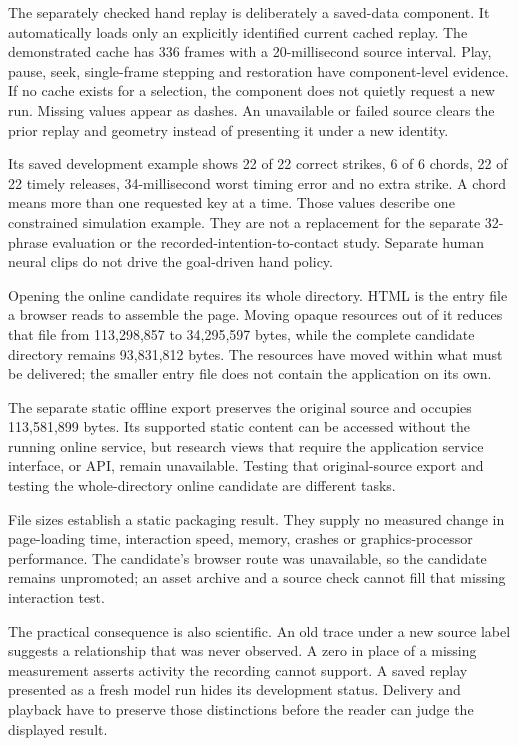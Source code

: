 The separately checked hand replay is deliberately a saved-data component.
It automatically loads only an explicitly identified current cached replay.
The demonstrated cache has 336 frames with a 20-millisecond source interval.
Play, pause, seek, single-frame stepping and restoration have component-level
evidence. If no cache exists for a selection, the component does not quietly
request a new run. Missing values appear as dashes. An unavailable or failed
source clears the prior replay and geometry instead of presenting it under a
new identity.

Its saved development example shows 22 of 22 correct strikes, 6 of 6 chords,
22 of 22 timely releases, 34-millisecond worst timing error and no extra strike.
A chord means more than one requested key at a time. Those values describe
one constrained simulation example. They are not a replacement for the separate
32-phrase evaluation or the recorded-intention-to-contact study. Separate human
neural clips do not drive the goal-driven hand policy.

Opening the online candidate requires its whole directory. HTML is the entry
file a browser reads to assemble the page. Moving opaque resources out of it
reduces that file from 113,298,857 to 34,295,597 bytes, while the complete
candidate directory remains 93,831,812 bytes. The resources have moved within
what must be delivered; the smaller entry file does not contain the application
on its own.

The separate static offline export preserves the original source and occupies
113,581,899 bytes. Its supported static content can be accessed without the
running online service, but research views that require the application service
interface, or API, remain unavailable. Testing that original-source export and
testing the whole-directory online candidate are different tasks.

File sizes establish a static packaging result. They supply no measured change
in page-loading time, interaction speed, memory, crashes or graphics-processor
performance. The candidate's browser route was unavailable, so the candidate
remains unpromoted; an asset archive and a source check cannot fill that missing
interaction test.

The practical consequence is also scientific. An old trace under a new source
label suggests a relationship that was never observed. A zero in place of a
missing measurement asserts activity the recording cannot support. A saved
replay presented as a fresh model run hides its development status. Delivery
and playback have to preserve those distinctions before the reader can judge
the displayed result.

